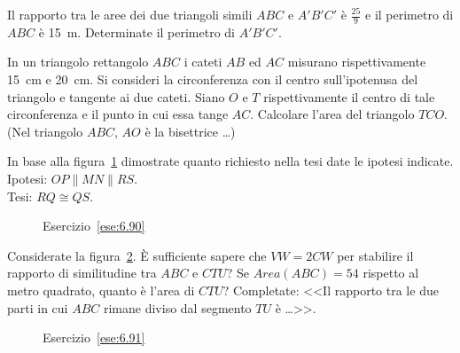 \begin{multicols}{2}
\begin{esercizio}
\label{ese:6.88}
Il rapporto tra le aree dei due triangoli simili \(ABC\) e \(A'B'C'\) è 
\(\frac{25}{9}\) e il perimetro di \(ABC\) è 15~m. Determinate il 
perimetro di \(A'B'C'\).
\end{esercizio}

\begin{esercizio}
\label{ese:6.89}
In un triangolo rettangolo \(ABC\) i cateti \(AB\) ed \(AC\) misurano 
rispettivamente 15~cm e 20~cm. Si consideri la circonferenza con il 
centro sull'ipotenusa del triangolo e tangente ai due cateti. Siano 
\(O\) e \(T\) rispettivamente il centro di tale circonferenza e il punto 
in cui essa tange \(AC\). Calcolare l'area del triangolo \(TCO\). (Nel 
triangolo \(ABC\), \(AO\) è la bisettrice \ldots)
\end{esercizio}

\begin{esercizio}
\label{ese:6.90}
In base alla figura~\ref{fig:ese6.90} dimostrate quanto richiesto 
nella tesi date le ipotesi indicate.\\
Ipotesi: \(OP\parallel MN\parallel RS\).\\
Tesi: \(RQ\cong QS\).
\end{esercizio}


\begin{inaccessibleblock}
 \begin{figure}[!htb]
	\centering
	\caption{Esercizio~\ref{ese:6.90}}\label{fig:ese6.90}
\end{figure}
\end{inaccessibleblock}

\begin{esercizio}
\label{ese:6.91}
Considerate la figura~\ref{fig:ese6.91}. \`E sufficiente sapere che 
\(VW=2CW\) per stabilire il rapporto di similitudine tra \(ABC\) e \(CTU\)? 
Se \(Area(ABC) = 54\) rispetto al metro quadrato, quanto è l'area di 
\(CTU\)? Completate: <<Il rapporto tra le due parti in cui \(ABC\) rimane 
diviso dal segmento \(TU\) è \ldots{}>>.
\end{esercizio}


\begin{inaccessibleblock}
 \begin{figure}[!htb]
	\centering
	\caption{Esercizio~\ref{ese:6.91}}\label{fig:ese6.91}
\end{figure}
\end{inaccessibleblock}


\end{multicols}
